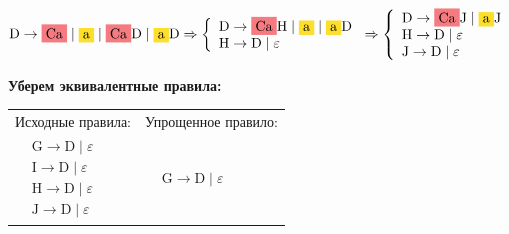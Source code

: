 \documentclass[12pt,onecolumn]{article}
\newcommand{\hlr}[1]{
  \colorbox{Salmon}{#1}
}
\newcommand{\hly}[1]{
  \colorbox{Goldenrod}{#1}
}
\begin{document}
$
    \mathrm{D} \to \mathrm{\hlr{Ca}} \mid \mathrm{\hly{a}} \mid \mathrm{\hlr{Ca}D} \mid \mathrm{\hly{a}D}
    \Rightarrow
    \left\{
    \begin{array}{l}
        \mathrm{D} \to \mathrm{\hlr{Ca}H} \mid \mathrm{\hly{a}} \mid \mathrm{\hly{a}D} \\
        \mathrm{H} \to \mathrm{D} \mid \varepsilon
    \end{array}
    \right.
    \Rightarrow
    \left\{
    \begin{array}{l}
        \mathrm{D} \to \mathrm{\hlr{Ca}J} \mid \mathrm{\hly{a}J} \\
        \mathrm{H} \to \mathrm{D} \mid \varepsilon               \\
        \mathrm{J} \to \mathrm{D} \mid \varepsilon
    \end{array}
    \right.
$


\begin{center}
    \textbf{Уберем эквивалентные правила:}\\[1em]
    \begin{tabularx}{0.6\textwidth}{X|X}
        Исходные правила:                                &
        Упрощенное правило:                                \\
        $\begin{aligned}
                  & \mathrm{G} \to \mathrm{D} \mid \varepsilon \\
                  & \mathrm{I} \to \mathrm{D} \mid \varepsilon \\
                  & \mathrm{H} \to \mathrm{D} \mid \varepsilon \\
                  & \mathrm{J} \to \mathrm{D} \mid \varepsilon
             \end{aligned}$ &
        $\begin{aligned}
                  & \mathrm{G} \to \mathrm{D} \mid \varepsilon
             \end{aligned}$
    \end{tabularx}
\end{center}
\end{document}
